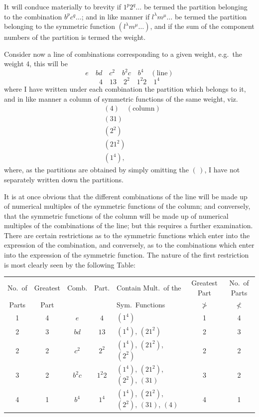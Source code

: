 \documentclass[11pt]{article}
\begin{document}
It will conduce materially to brevity if $1^p 2^q \ldots$ be termed the partition belonging to the combination $b^p c^q\ldots$; and in like manner if $l^\lambda m^\mu\ldots$ be termed the partition belonging to the symmetric function $(l^\lambda m^\mu\ldots)$, and if the sum of the component numbers of the partition is termed the weight.

Consider now a line of combinations corresponding to a given weight, e.g.\ the weight 4, this will be
\[
e\quad bd\quad c^2\quad b^2 c\quad b^4 \quad (\text{line})
\]
\[
4\quad 13\quad 2^2\quad 1^2 2\quad 1^4
\]
where I have written under each combination the partition which belongs to it, and in like manner a column of symmetric functions of the same weight, viz.
\begin{align*}
&(4) \quad (\text{column})\\
&(31)\\
&(2^2)\\
&(21^2)\\
&(1^4),
\end{align*}
where, as the partitions are obtained by simply omitting the $(\,)$, I have not separately written down the partitions.

It is at once obvious that the different combinations of the line will be made up of numerical multiples of the symmetric functions of the column; and conversely, that the symmetric functions of the column will be made up of numerical multiples of the combinations of the line; but this requires a further examination. There are certain restrictions as to the symmetric functions which enter into the expression of the combination, and conversely, as to the combinations which enter into the expression of the symmetric function. The nature of the first restriction is most clearly seen by the following Table:

\medskip

\begin{center}\footnotesize
\begin{tabular}{|c|c|c|c|l|c|c|}
\hline
No.\ of & Greatest & Comb. & Part. & Contain Mult.\ of the & Greatest Part & No.\ of Parts \\
Parts & Part & & & Sym.\ Functions & $\not>$ & $\not<$ \\
\hline
1 & 4 & $e$     & $4$    & $(1^4)$ & 1 & 4 \\
2 & 3 & $bd$    & $13$   & $(1^4)$, $(21^2)$ & 2 & 3 \\
2 & 2 & $c^2$   & $2^2$  & $(1^4)$, $(21^2)$, $(2^2)$ & 2 & 2 \\
3 & 2 & $b^2 c$ & $1^2 2$& $(1^4)$, $(21^2)$, $(2^2)$, $(31)$ & 3 & 2 \\
4 & 1 & $b^4$   & $1^4$  & $(1^4)$, $(21^2)$, $(2^2)$, $(31)$, $(4)$ & 4 & 1 \\
\hline
\end{tabular}
\end{center}
\end{document}
